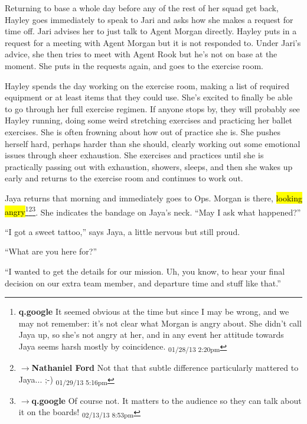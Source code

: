 


Returning to base a whole day before any of the rest of her squad get back, Hayley goes immediately to speak to Jari and asks how she makes a request for time off.  Jari advises her to just talk to Agent Morgan directly.  Hayley puts in a request for a meeting with Agent Morgan but it is not responded to.  Under Jari's advice, she then tries to meet with Agent Rook but he's not on base at the moment.  She puts in the requests again, and goes to the exercise room.



Hayley spends the day working on the exercise room, making a list of required equipment or at least items that they could use.  She's excited to finally be able to go through her full exercise regimen.  If anyone stops by, they will probably see Hayley running, doing some weird stretching exercises and practicing her ballet exercises.  She is often frowning about how out of practice she is.  She pushes herself hard, perhaps harder than she should, clearly working out some emotional issues through sheer exhaustion.  She exercises and practices until she is practically passing out with exhaustion, showers, sleeps, and then she wakes up early and returns to the exercise room and continues to work out.



Jaya returns that morning and immediately goes to Ops.  Morgan is there, \hl{looking angry}\footnote{\textbf{q.google }It seemed obvious at the time but since I may be wrong, and we may not remember: it's not clear what Morgan is angry about.  She didn't call Jaya up, so she's not angry at her, and in any event her attitude towards Jaya seems harsh mostly by coincidence. \textsubscript{01/28/13 2:20pm}}\footnote{$\rightarrow$\textbf{Nathaniel Ford }Not that that subtle difference particularly mattered to Jaya... ;-) \textsubscript{01/29/13 5:16pm}}\footnote{$\rightarrow$\textbf{q.google }Of course not.  It matters to the audience so they can talk about it on the boards! \textsubscript{02/13/13 8:53pm}}.  She indicates the bandage on Jaya's neck. ``May I ask what happened?''

``I got a sweet tattoo,'' says Jaya, a little nervous but still proud.

``What are you here for?''

``I wanted to get the details for our mission.  Uh, you know, to hear your final decision on our extra team member, and departure time and stuff like that.''

